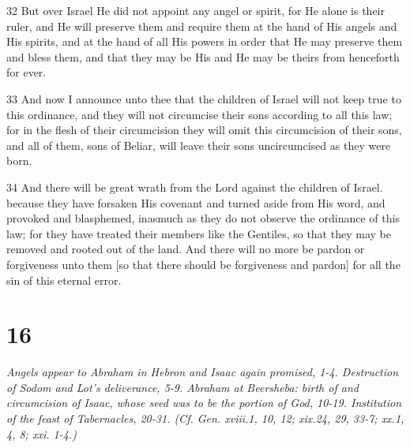 \par 32 But over Israel He did not appoint any angel or spirit, for He alone is their ruler, and He will preserve them and require them at the hand of His angels and His spirits, and at the hand of all His powers in order that He may preserve them and bless them, and that they may be His and He may be theirs from henceforth for ever.
\par 33 And now I announce unto thee that the children of Israel will not keep true to this ordinance, and they will not circumcise their sons according to all this law; for in the flesh of their circumcision they will omit this circumcision of their sons, and all of them, sons of Beliar, will leave their sons uncircumcised as they were born.
\par 34 And there will be great wrath from the Lord against the children of Israel. because they have forsaken His covenant and turned aside from His word, and provoked and blasphemed, inasmuch as they do not observe the ordinance of this law; for they have treated their members like the Gentiles, so that they may be removed and rooted out of the land. And there will no more be pardon or forgiveness unto them [so that there should be forgiveness and pardon] for all the sin of this eternal error.

\chapter{16}

\par \textit{Angels appear to Abraham in Hebron and Isaac again promised, 1-4. Destruction of Sodom and Lot's deliverance, 5-9. Abraham at Beersheba: birth of and circumcision of Isaac, whose seed was to be the portion of God, 10-19. Institution of the feast of Tabernacles, 20-31. (Cf. Gen. xviii.1, 10, 12; xix.24, 29, 33-7; xx.1, 4, 8; xxi. 1-4.)}

